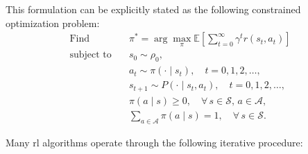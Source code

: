 This formulation can be explicitly stated as the following constrained optimization problem:
\begin{equation}\label{eq:RL_opt}
\begin{aligned}
\text{Find} \quad & \pi^* = \arg\max_{\pi} \mathbb{E}\left[\sum_{t=0}^{\infty} \gamma^t r(s_t, a_t)\right] \\
\text{subject to} \quad & s_0 \sim \rho_0, \\
& a_t \sim \pi(\cdot \mid s_t), \quad t = 0,1,2,\ldots, \\
& s_{t+1} \sim P(\cdot \mid s_t, a_t), \quad t = 0,1,2,\ldots, \\
& \pi(a \mid s) \geq 0,\quad \forall\, s \in \mathcal{S},\, a \in \mathcal{A}, \\
& \sum_{a \in \mathcal{A}} \pi(a \mid s) = 1,\quad \forall\, s \in \mathcal{S}.
\end{aligned}
\end{equation}

Many \gls{rl} algorithms operate through the following iterative procedure:

